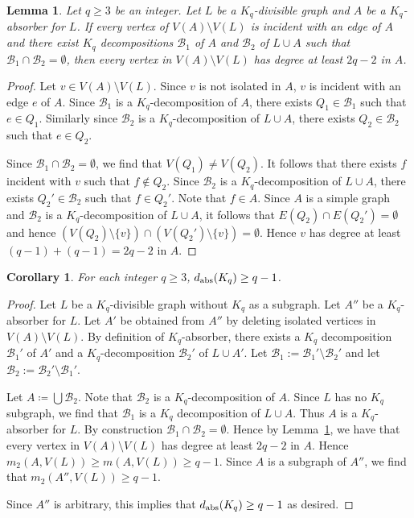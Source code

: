 \documentclass[11pt]{article}
\numberwithin{equation}{section}
\newcounter{i}
\theoremstyle{plain}
\newtheorem{lem}[thm]{Lemma}
\newtheorem{cor}[thm]{Corollary}
\theoremstyle{plain} %
\theoremstyle{definition}
\begin{document}
\begin{lem}\label{lem:AbsLowerBound}
Let $q\ge 3$ be an integer. Let $L$ be a $K_q$-divisible graph and $A$ be a $K_q$-absorber for $L$. If every vertex of $V(A)\setminus V(L)$ is incident with an edge of $A$ and there exist $K_q$ decompositions $\mathcal{B}_1$ of $A$ and $\mathcal{B}_2$ of $L\cup A$ such that $\mathcal{B}_1\cap \mathcal{B}_2 =\emptyset$, then every vertex in $V(A)\setminus V(L)$ has degree at least $2q-2$ in $A$. 
\end{lem}
\begin{proof}
Let $v\in V(A)\setminus V(L)$. Since $v$ is not isolated in $A$, $v$ is incident with an edge $e$ of $A$. Since $\mathcal{B}_1$ is a $K_q$-decomposition of $A$, there exists $Q_1\in \mathcal{B}_1$ such that $e\in Q_1$. Similarly since $\mathcal{B}_2$ is a $K_q$-decomposition of $L\cup A$, there exists $Q_2\in \mathcal{B}_2$ such that $e\in Q_2$. 

Since $\mathcal{B}_1\cap \mathcal{B}_2=\emptyset$, we find that $V(Q_1)\ne V(Q_2)$. It follows that there exists $f$ incident with $v$ such that $f\not\in Q_2$. Since $\mathcal{B}_2$ is a $K_q$-decomposition of $L\cup A$, there exists $Q_2'\in \mathcal{B}_2$ such that $f\in Q_2'$. Note that $f\in A$. Since $A$ is a simple graph and $\mathcal{B}_2$ is a $K_q$-decomposition of $L\cup A$, it follows that $E(Q_2)\cap E(Q_2')=\emptyset$ and hence $(V(Q_2)\setminus \{v\})\cap (V(Q_2')\setminus \{v\})=\emptyset$. Hence $v$ has degree at least $(q-1)+(q-1)=2q-2$ in $A$.         
\end{proof}


\begin{cor}\label{cor:AbsLowerBound}
For each integer $q\ge 3$, $d_{\rm abs}(K_q)\ge q-1$.    
\end{cor}
\begin{proof}
Let $L$ be a $K_q$-divisible graph without $K_q$ as a subgraph. Let $A''$ be a $K_q$-absorber for $L$. Let $A'$ be obtained from $A''$ by deleting isolated vertices in $V(A)\setminus V(L)$. By definition of $K_q$-absorber, there exists a $K_q$ decomposition $\mathcal{B}_1'$ of $A'$ and a $K_q$-decomposition $\mathcal{B}_2'$ of $L\cup A'$. Let $\mathcal{B}_1 := \mathcal{B}_1'\setminus \mathcal{B}_2'$ and let $\mathcal{B}_2 := \mathcal{B}_2'\setminus \mathcal{B}_1'$. 

Let $A\coloneqq \bigcup \mathcal{B}_2$. Note that $\mathcal{B}_2$ is a $K_q$-decomposition of $A$. Since $L$ has no $K_q$ subgraph, we find that $\mathcal{B}_1$ is a $K_q$ decomposition of $L\cup A$.  Thus $A$ is a $K_q$-absorber for $L$. By construction $\mathcal{B}_1\cap \mathcal{B}_2 = \emptyset$. Hence by Lemma~\ref{lem:AbsLowerBound}, we have that every vertex in $V(A)\setminus V(L)$ has degree at least $2q-2$ in $A$. Hence $m_2(A,V(L))\ge m(A,V(L))\ge q-1$. Since $A$ is a subgraph of $A''$, we find that $m_2(A'',V(L))\ge q-1$.

Since $A''$ is arbitrary, this implies that $d_{\rm abs}(K_q)\ge q-1$ as desired.
\end{proof}
\end{document}
